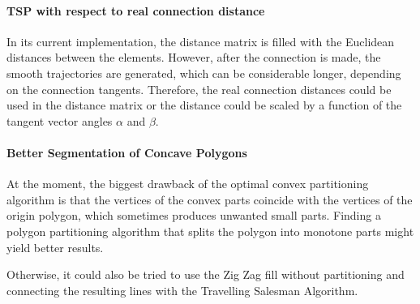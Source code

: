 \paragraph{TSP with respect to real connection distance}

In its current implementation, the distance matrix is filled with the Euclidean distances between the elements. However, after the connection is made, the smooth trajectories are generated, which can be considerable longer, depending on the connection tangents. Therefore, the real connection distances could be used in the distance matrix or the distance could be scaled by a function of the tangent vector angles $\alpha$ and $\beta$.

\paragraph{Better Segmentation of Concave Polygons}

At the moment, the biggest drawback of the optimal convex partitioning algorithm is that the vertices of the convex parts coincide with the vertices of the origin polygon, which sometimes produces unwanted small parts. Finding a polygon partitioning algorithm that splits the polygon into monotone parts might yield better results.

Otherwise, it could also be tried to use the Zig Zag fill without partitioning and connecting the resulting lines with the Travelling Salesman Algorithm.




